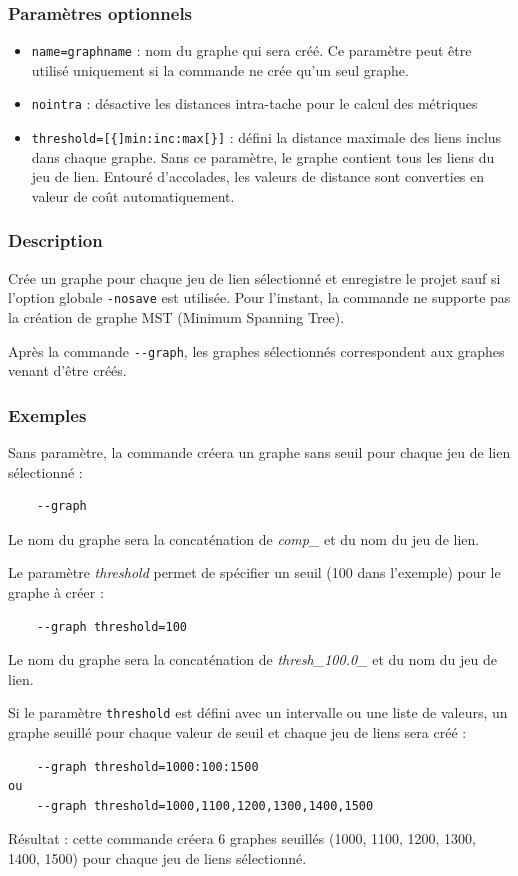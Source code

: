 \documentclass[a4paper,10pt]{report}
\begin{document}
\subsubsection{Paramètres optionnels}
\begin{itemize}
	\item \verb|name=graphname| : nom du graphe qui sera créé. Ce paramètre peut être utilisé uniquement si la commande ne crée qu'un seul graphe.
	\item \verb|nointra| : désactive les distances intra-tache pour le calcul des métriques
	\item \verb|threshold=[{]min:inc:max[}]| : défini la distance maximale des liens inclus dans chaque graphe. Sans ce paramètre, le graphe contient tous les liens du jeu de lien. Entouré d'accolades, les valeurs de distance sont converties en valeur de coût automatiquement.
\end{itemize}

\subsubsection{Description}
Crée un graphe pour chaque jeu de lien sélectionné et enregistre le projet sauf si l'option globale \verb|-nosave| est utilisée.
Pour l'instant, la commande ne supporte pas la création de graphe MST (Minimum Spanning Tree).

Après la commande \verb|--graph|, les graphes sélectionnés correspondent aux graphes venant d'être créés.

\subsubsection{Exemples}
Sans paramètre, la commande créera un graphe sans seuil pour chaque jeu de lien sélectionné :
\begin{Verbatim}
	--graph
\end{Verbatim}
Le nom du graphe sera la concaténation de \textit{comp\_} et du nom du jeu de lien.

Le paramètre \textit{threshold} permet de spécifier un seuil (100 dans l'exemple) pour le graphe à créer :
\begin{Verbatim}
	--graph threshold=100
\end{Verbatim}
Le nom du graphe sera la concaténation de  \textit{thresh\_100.0\_} et du nom du jeu de lien.

Si le paramètre \verb|threshold| est défini avec un intervalle ou une liste de valeurs, un graphe seuillé pour chaque valeur de seuil et chaque jeu de liens sera créé :
\begin{Verbatim}
	--graph threshold=1000:100:1500
ou
	--graph threshold=1000,1100,1200,1300,1400,1500
\end{Verbatim}
Résultat : cette commande créera 6 graphes seuillés (1000, 1100, 1200, 1300, 1400, 1500) pour chaque jeu de liens sélectionné.
\end{document}
